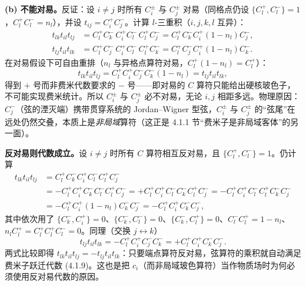 \textbf{(b) 不能对易。}反证：设 $i\ne j$ 时所有 $C^\pm_i$ 与 $C^\pm_j$ 对易（同格点仍设 $\{C^+_l,C^-_l\}=1$，$C^+_lC^-_l=n_l$），并设 $t_{ij}=C^+_iC^-_j$。计算 $l$-三重积（$i,j,k,l$ 互异）：
\begin{align*}
t_{lk}t_{il}t_{lj}&=C^+_lC^-_k\,C^+_iC^-_l\,C^+_lC^-_j
=C^+_lC^-_kC^+_i(1-n_l)C^-_j ,\\
t_{lj}t_{il}t_{lk}&=C^+_lC^-_j\,C^+_iC^-_l\,C^+_lC^-_k
=C^+_lC^-_jC^+_i(1-n_l)C^-_k .
\end{align*}
在对易假设下可自由重排（$n_l$ 与异格点算符对易，$C^+_l(1-n_l)=C^+_l$）：
\begin{equation*}
t_{lk}t_{il}t_{lj}=C^+_lC^+_iC^-_jC^-_k(1-n_l)
=t_{lj}t_{il}t_{lk},
\end{equation*}
得到 $+$ 号而非费米代数要求的 $-$ 号——即对易的 $C$ 算符只能给出硬核玻色子，不可能实现费米统计。所以 $C^\pm_i$ 与 $C^\pm_j$ 必不对易，无论 $i,j$ 相距多远。物理原因：$C^-_j$（弦的湮灭端）携带贯穿系统的 Jordan--Wigner 型弦，$C^\pm_i$ 与 $C^\pm_j$ 的“弦尾”在远处仍然交叠，本质上是\emph{非局域}算符（这正是 4.1.1 节“费米子是非局域客体”的另一面）。

\textbf{反对易则代数成立。}设 $i\ne j$ 时所有 $C$ 算符相互反对易，且 $\{C^+_l,C^-_l\}=1$。仍计算
\begin{align*}
t_{lk}t_{il}t_{lj}
&=C^+_lC^-_kC^+_iC^-_lC^+_lC^-_j\\
&=-C^+_lC^+_iC^-_kC^-_lC^+_lC^-_j
=+C^+_lC^+_iC^-_lC^-_kC^+_lC^-_j
=-C^+_lC^+_iC^-_lC^+_lC^-_kC^-_j\\
&=-C^+_lC^+_i(1-n_l)C^-_kC^-_j
=-C^+_lC^+_iC^-_kC^-_j ,
\end{align*}
其中依次用了 $\{C^-_k,C^+_i\}=0$、$\{C^-_k,C^-_l\}=0$、$\{C^-_k,C^+_l\}=0$、$C^-_lC^+_l=1-n_l$、$n_lC^+_l=C^+_lC^+_lC^-_l=0$。同理（交换 $j\leftrightarrow k$）
\begin{equation*}
t_{lj}t_{il}t_{lk}=-C^+_lC^+_iC^-_jC^-_k=+C^+_lC^+_iC^-_kC^-_j .
\end{equation*}
两式比较即得 $t_{lk}t_{il}t_{lj}=-t_{lj}t_{il}t_{lk}$：只要端点算符反对易，弦算符的乘积就自动满足费米子跃迁代数 (4.1.9)。这也是把 $c_i$（而非局域玻色算符）当作物质场时为何必须使用反对易代数的原因。

